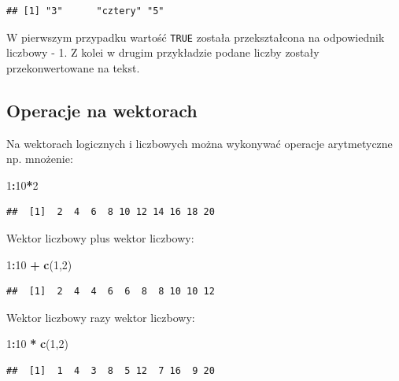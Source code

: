 \documentclass[]{book}
\newenvironment{Shaded}{\begin{snugshade}}{\end{snugshade}}
\newcommand{\KeywordTok}[1]{\textcolor[rgb]{0.13,0.29,0.53}{\textbf{#1}}}
\newcommand{\DecValTok}[1]{\textcolor[rgb]{0.00,0.00,0.81}{#1}}
\newcommand{\StringTok}[1]{\textcolor[rgb]{0.31,0.60,0.02}{#1}}
\newcommand{\OperatorTok}[1]{\textcolor[rgb]{0.81,0.36,0.00}{\textbf{#1}}}
\newcommand{\NormalTok}[1]{#1}
\begin{document}
\begin{verbatim}
## [1] "3"      "cztery" "5"
\end{verbatim}

W pierwszym przypadku wartość \texttt{TRUE} została przekształcona na
odpowiednik liczbowy - 1. Z kolei w drugim przykładzie podane liczby
zostały przekonwertowane na tekst.

\subsection{Operacje na wektorach}\label{operacje-na-wektorach}

Na wektorach logicznych i liczbowych można wykonywać operacje
arytmetyczne np. mnożenie:

\begin{Shaded}
\begin{Highlighting}[]
\DecValTok{1}\OperatorTok{:}\DecValTok{10}\OperatorTok{*}\DecValTok{2}
\end{Highlighting}
\end{Shaded}

\begin{verbatim}
##  [1]  2  4  6  8 10 12 14 16 18 20
\end{verbatim}

Wektor liczbowy plus wektor liczbowy:

\begin{Shaded}
\begin{Highlighting}[]
\DecValTok{1}\OperatorTok{:}\DecValTok{10} \OperatorTok{+}\StringTok{ }\KeywordTok{c}\NormalTok{(}\DecValTok{1}\NormalTok{,}\DecValTok{2}\NormalTok{)}
\end{Highlighting}
\end{Shaded}

\begin{verbatim}
##  [1]  2  4  4  6  6  8  8 10 10 12
\end{verbatim}

Wektor liczbowy razy wektor liczbowy:

\begin{Shaded}
\begin{Highlighting}[]
\DecValTok{1}\OperatorTok{:}\DecValTok{10} \OperatorTok{*}\StringTok{ }\KeywordTok{c}\NormalTok{(}\DecValTok{1}\NormalTok{,}\DecValTok{2}\NormalTok{)}
\end{Highlighting}
\end{Shaded}

\begin{verbatim}
##  [1]  1  4  3  8  5 12  7 16  9 20
\end{verbatim}
\end{document}
